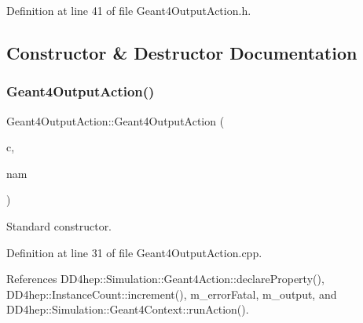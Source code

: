 Definition at line 41 of file Geant4\+Output\+Action.\+h.



\subsection{Constructor \& Destructor Documentation}
\hypertarget{class_d_d4hep_1_1_simulation_1_1_geant4_output_action_a095341c53692a4dda8e7af42075691a2}{}\label{class_d_d4hep_1_1_simulation_1_1_geant4_output_action_a095341c53692a4dda8e7af42075691a2} 
\subsubsection{\texorpdfstring{Geant4\+Output\+Action()}{Geant4OutputAction()}}
{\footnotesize\ttfamily Geant4\+Output\+Action\+::\+Geant4\+Output\+Action (\begin{DoxyParamCaption}\item[{\hyperlink{class_d_d4hep_1_1_simulation_1_1_geant4_context}{Geant4\+Context} $\ast$}]{c,  }\item[{const std\+::string \&}]{nam }\end{DoxyParamCaption})}



Standard constructor. 



Definition at line 31 of file Geant4\+Output\+Action.\+cpp.



References D\+D4hep\+::\+Simulation\+::\+Geant4\+Action\+::declare\+Property(), D\+D4hep\+::\+Instance\+Count\+::increment(), m\+\_\+error\+Fatal, m\+\_\+output, and D\+D4hep\+::\+Simulation\+::\+Geant4\+Context\+::run\+Action().

\hypertarget{class_d_d4hep_1_1_simulation_1_1_geant4_output_action_aeead76ac5f330277dfb11c924bbfbc08}{}\label{class_d_d4hep_1_1_simulation_1_1_geant4_output_action_aeead76ac5f330277dfb11c924bbfbc08} 
